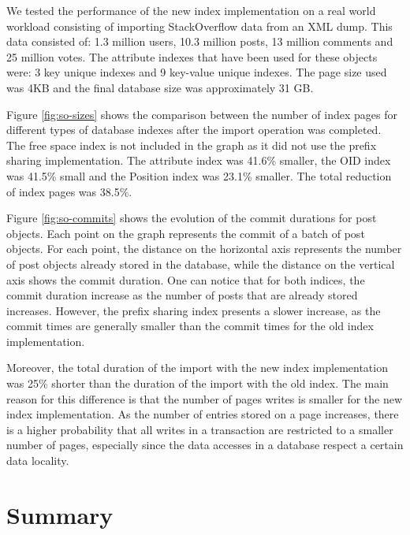\documentclass[11pt,a4paper,oneside]{article}
\begin{document}
We tested the performance of the new index implementation on a real world workload consisting of importing StackOverflow data from an XML dump. This data consisted of: 1.3 million users, 10.3 million posts, 13 million comments and 25 million votes. The attribute indexes that have been used for these objects were: 3 key unique indexes and 9 key-value unique indexes. The page size used was 4KB and the final database size was approximately 31 GB. 

Figure \ref{fig:so-sizes} shows the comparison between the number of index pages for different types of database indexes after the import operation was completed. The free space index is not included in the graph as it did not use the prefix sharing implementation. The attribute index was 41.6\% smaller, the OID index was 41.5\% small and the Position index was 23.1\% smaller. The total reduction of index pages was 38.5\%. 

Figure \ref{fig:so-commits} shows the evolution of the commit durations for post objects. Each point on the graph represents the commit of a batch of post objects. For each point, the distance on the horizontal axis represents the number of post objects already stored in the database, while the distance on the vertical axis shows the commit duration. One can notice that for both indices, the commit duration increase as the number of posts that are already stored increases. However, the prefix sharing index presents a slower increase, as the commit times are generally smaller than the commit times for the old index implementation. 

Moreover, the total duration of the import with the new index implementation was 25\% shorter than the duration of the import with the old index. The main reason for this difference is that the number of pages writes is smaller for the new index implementation. As the number of entries stored on a page increases, there is a higher probability that all writes in a transaction are restricted to a smaller number of pages, especially since the data accesses in a database respect a certain data locality.

\section{Summary} %
\label{sec:summary}
\end{document}
